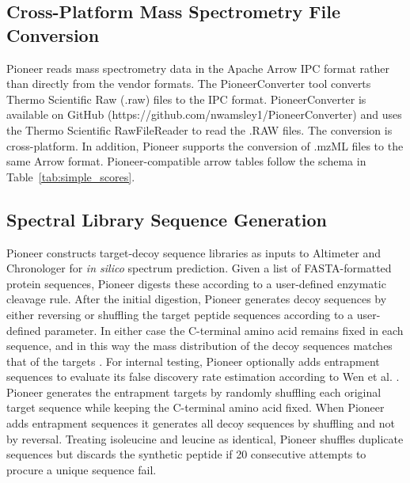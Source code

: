\documentclass[pdflatex,sn-nature]{sn-jnl}
\begin{document}


\subsection{Cross-Platform Mass Spectrometry File Conversion}\label{subsec1}

Pioneer reads mass spectrometry data in the Apache Arrow IPC format rather than directly from the vendor formats. The PioneerConverter tool converts Thermo Scientific Raw (.raw) files to the IPC format. PioneerConverter is available on GitHub (https://github.com/nwamsley1/PioneerConverter) and uses the Thermo Scientific RawFileReader to read the .RAW files. The conversion is cross-platform. In addition, Pioneer supports the conversion of .mzML files to the same Arrow format. Pioneer-compatible arrow tables follow the schema in Table~\ref{tab:simple_scores}. 

\subsection{Spectral Library Sequence Generation}\label{subsec2}
Pioneer constructs target-decoy sequence libraries as inputs to Altimeter and Chronologer for \textit{in silico} spectrum prediction. Given a list of FASTA-formatted protein sequences, Pioneer digests these according to a user-defined enzymatic cleavage rule. After the initial digestion, Pioneer generates decoy sequences by either reversing or shuffling the target peptide sequences according to a user-defined parameter. In either case the C-terminal amino acid remains fixed in each sequence, and in this way the mass distribution of the decoy sequences matches that of the targets \cite{Freestone2023-ef}. For internal testing, Pioneer optionally adds entrapment sequences to evaluate its false discovery rate estimation according to Wen et al. \cite{Wen2024-jv}. Pioneer generates the entrapment targets by randomly shuffling each original target sequence while keeping the C-terminal amino acid fixed. When Pioneer adds entrapment sequences it generates all decoy sequences by shuffling and not by reversal. Treating isoleucine and leucine as identical, Pioneer shuffles duplicate sequences but discards the synthetic peptide if 20 consecutive attempts to procure a unique sequence fail.  
\end{document}
